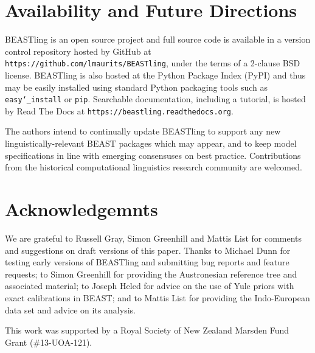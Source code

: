 \documentclass[10pt,a4paper]{article}
\begin{document}
\section{Availability and Future Directions}

BEASTling is an open source project and full source code is available in a version control repository hosted by GitHub at \texttt{https://github.com/lmaurits/BEASTling}, under the terms of a 2-clause BSD license.  BEASTling is also hosted at the Python Package Index (PyPI) and thus may be easily installed using standard Python packaging tools such as \texttt{easy\char`_install} or \texttt{pip}.  Searchable documentation, including a tutorial, is hosted by Read The Docs at \texttt{https://beastling.readthedocs.org}.

The authors intend to continually update BEASTling to support any new linguistically-relevant BEAST packages which may appear, and to keep model specifications in line with emerging consensuses on best practice.  Contributions from the historical computational linguistics research community are welcomed.

\section{Acknowledgemnts}

We are grateful to Russell Gray, Simon Greenhill and Mattis List for comments and suggestions on draft versions of this paper.  Thanks to Michael Dunn for testing early versions of BEASTling and submitting bug reports and feature requests; to Simon Greenhill for providing the Austronesian reference tree and associated material; to Joseph Heled for advice on the use of Yule priors with exact calibrations in BEAST; and to Mattis List for providing the Indo-European data set and advice on its analysis.

This work was supported by a Royal Society of New Zealand Marsden Fund Grant (\#13-UOA-121).



\end{document}
